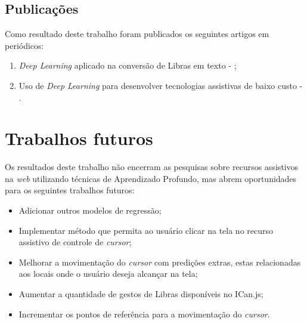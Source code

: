 \subsection{Publicações}

\par Como resultado deste trabalho foram publicados os seguintes artigos em periódicos:

\begin{enumerate}
    \item \textit{Deep Learning} aplicado na conversão de Libras em texto - \cite{fmenino2019a};
    \item Uso de \textit{Deep Learning} para desenvolver tecnologias assistivas de baixo custo - \cite{fmenino2019b}.
\end{enumerate}

\section{Trabalhos futuros}

Os resultados deste trabalho não encerram as pesquisas sobre recursos assistivos na \textit{web} utilizando técnicas de Aprendizado Profundo, mas abrem oportunidades para os seguintes trabalhos futuros:

\begin{itemize}
    \item Adicionar outros modelos de regressão;
    \item Implementar método que permita ao usuário clicar na tela no recurso assistivo de controle de \textit{cursor};
    \item Melhorar a movimentação do \textit{cursor} com predições extras, estas relacionadas aos locais onde o usuário deseja alcançar na tela;
    \item Aumentar a quantidade de gestos de Libras disponíveis no ICan.js;
    \item Incrementar os pontos de referência para a movimentação do \textit{cursor}.
\end{itemize}

